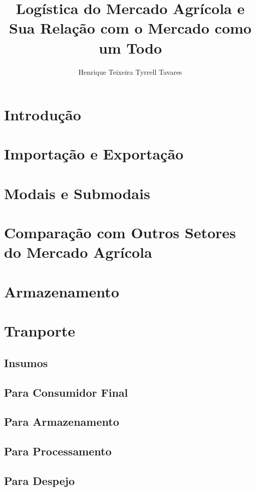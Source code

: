 \documentclass[]{article}
\title{Logística do Mercado Agrícola e Sua Relação com o Mercado como um Todo}
\author{Henrique Teixeira Tyrrell Tavares}
\begin{document}
	
	\maketitle
	
	\begin{abstract}
		
	\end{abstract}
	
	\section{Introdução}
	
	\section{Importação e Exportação}
	
	\section{Modais e Submodais}

	\section{Comparação com Outros Setores do Mercado Agrícola}

	\section{Armazenamento}

	\section{Tranporte}

	\subsection{Insumos}
	
	\subsection{Para Consumidor Final}
	
	\subsection{Para Armazenamento}
	
	\subsection{Para Processamento}
	
	\subsection{Para Despejo}
	
	
	
\end{document}
